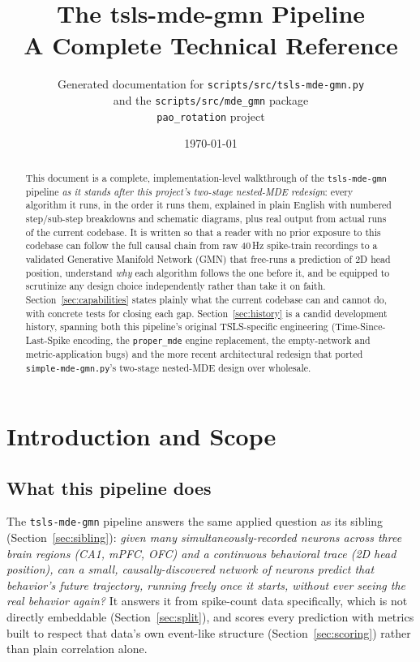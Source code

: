 \documentclass[11pt]{article}
\title{\textbf{The tsls-mde-gmn Pipeline}\\[4pt]\Large A Complete Technical Reference}
\author{Generated documentation for \texttt{scripts/src/tsls-mde-gmn.py}\\and the \texttt{scripts/src/mde\_gmn} package\\\texttt{pao\_rotation} project}
\date{\today}
\begin{document}
\maketitle
\thispagestyle{empty}

\begin{abstract}
\noindent This document is a complete, implementation-level walkthrough of the \texttt{tsls-mde-gmn} pipeline \emph{as it stands after this project's two-stage nested-MDE redesign}: every algorithm it runs, in the order it runs them, explained in plain English with numbered step/sub-step breakdowns and schematic diagrams, plus real output from actual runs of the current codebase. It is written so that a reader with no prior exposure to this codebase can follow the full causal chain from raw 40\,Hz spike-train recordings to a validated Generative Manifold Network (GMN) that free-runs a prediction of 2D head position, understand \emph{why} each algorithm follows the one before it, and be equipped to scrutinize any design choice independently rather than take it on faith. Section~\ref{sec:capabilities} states plainly what the current codebase can and cannot do, with concrete tests for closing each gap. Section~\ref{sec:history} is a candid development history, spanning both this pipeline's original TSLS-specific engineering (Time-Since-Last-Spike encoding, the \texttt{proper\_mde} engine replacement, the empty-network and metric-application bugs) and the more recent architectural redesign that ported \texttt{simple-mde-gmn.py}'s two-stage nested-MDE design over wholesale.
\end{abstract}

\tableofcontents
\newpage

\section{Introduction and Scope}
\label{sec:overview}

\subsection{What this pipeline does}
The \texttt{tsls-mde-gmn} pipeline answers the same applied question as its sibling (Section~\ref{sec:sibling}): \emph{given many simultaneously-recorded neurons across three brain regions (CA1, mPFC, OFC) and a continuous behavioral trace (2D head position), can a small, causally-discovered network of neurons predict that behavior's future trajectory, running freely once it starts, without ever seeing the real behavior again?} It answers it from spike-count data specifically, which is not directly embeddable (Section~\ref{sec:split}), and scores every prediction with metrics built to respect that data's own event-like structure (Section~\ref{sec:scoring}) rather than plain correlation alone.
\end{document}
